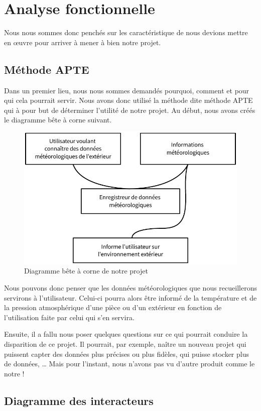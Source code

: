 \section{Analyse fonctionnelle}

Nous nous sommes donc penchés sur les caractéristique de nous devions mettre en œuvre pour arriver à mener à bien notre projet.

\subsection{Méthode APTE}

Dans un premier lieu, nous nous sommes demandés pourquoi, comment et pour qui cela pourrait servir. Nous avons donc utilisé la méthode dite \og méthode APTE \fg{} qui à pour but de déterminer l'utilité de notre projet. Au début, nous avons créés le diagramme bête à corne suivant.

\begin{figure}[!h]
	\centering
	\includegraphics[width=.6\linewidth]{Images/Diagramme_APTE}
	\caption{Diagramme bête à corne de notre projet}
\end{figure}

Nous pouvons donc penser que les données météorologiques que nous recueillerons servirons à l'utilisateur. Celui-ci pourra alors être informé de la température et de la pression atmosphérique d'une pièce ou d'un extérieur en fonction de l'utilisation faite par celui qui s'en servira.

Ensuite, il a fallu nous poser quelques questions sur ce qui pourrait conduire la disparition de ce projet. Il pourrait, par exemple, naître un nouveau projet qui puissent capter des données plus précises ou plus fidèles, qui puisse stocker plus de données, \dots{} Mais pour l'instant, nous n'avons pas vu d'autre produit comme le notre !

\subsection{Diagramme des interacteurs}

